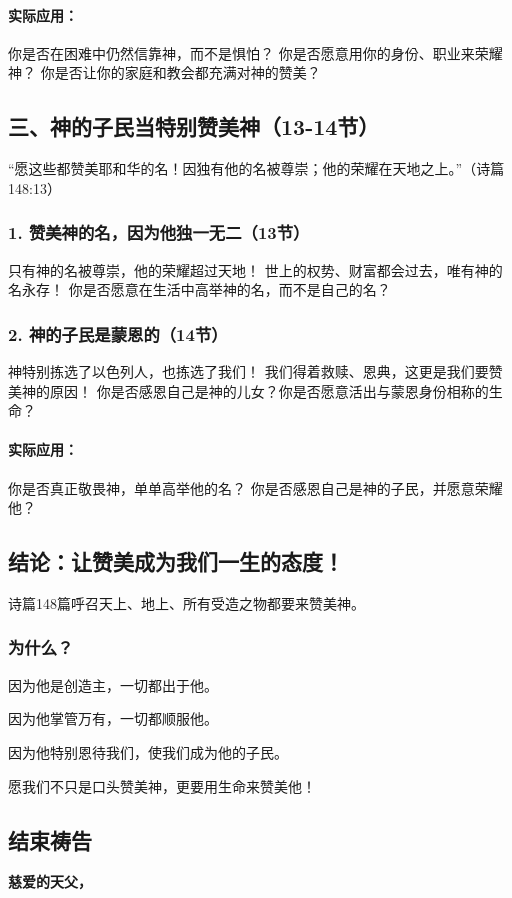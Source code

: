 \documentclass[a4paper, 12pt]{article}
\begin{document}
\paragraph*{实际应用：}
你是否在困难中仍然信靠神，而不是惧怕？
你是否愿意用你的身份、职业来荣耀神？
你是否让你的家庭和教会都充满对神的赞美？
\subsection*{三、神的子民当特别赞美神（13-14节）}
“愿这些都赞美耶和华的名！因独有他的名被尊崇；他的荣耀在天地之上。”（诗篇148:13）

\subsubsection*{1. 赞美神的名，因为他独一无二（13节）}
只有神的名被尊崇，他的荣耀超过天地！
世上的权势、财富都会过去，唯有神的名永存！
你是否愿意在生活中高举神的名，而不是自己的名？
\subsubsection*{2. 神的子民是蒙恩的（14节）}
神特别拣选了以色列人，也拣选了我们！
我们得着救赎、恩典，这更是我们要赞美神的原因！
你是否感恩自己是神的儿女？你是否愿意活出与蒙恩身份相称的生命？
\paragraph*{实际应用：}
你是否真正敬畏神，单单高举他的名？
你是否感恩自己是神的子民，并愿意荣耀他？
\subsection*{结论：让赞美成为我们一生的态度！}
诗篇148篇呼召天上、地上、所有受造之物都要来赞美神。

\subsubsection*{为什么？}

\hspace{0.6cm}因为他是创造主，一切都出于他。

因为他掌管万有，一切都顺服他。

因为他特别恩待我们，使我们成为他的子民。

愿我们不只是口头赞美神，更要用生命来赞美他！

\subsection*{结束祷告}
\textbf{慈爱的天父，}
\end{document}
